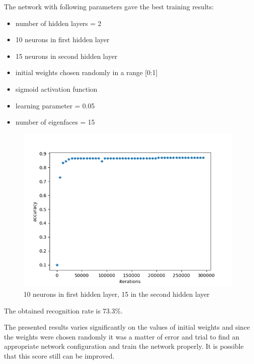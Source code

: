 The network with following parameters gave the best training results:

\begin{itemize}
\itemsep0em
\item number of hidden layers = 2
\item 10 neurons in first hidden layer
\item 15 neurons in second hidden layer
\item initial weights chosen randomly in a range [0:1]
\item sigmoid activation function
\item learning parameter = 0.05
\item number of eigenfaces = 15
\end{itemize}


\begin{figure}[H]
\centering
\includegraphics[scale=0.5]{img/tests/lwf/40ppl/h2/PCA_MLP15_10_104_best.png}
\caption{10 neurons in first hidden layer, 15 in the second hidden layer}
\end{figure}


The obtained recognition rate is 73.3\%. 

The presented results varies significantly on the values of initial weights and since the weights were chosen randomly it was a matter of error and trial to find an appropriate network configuration and train the network properly. It is possible that this score still can be improved. 


